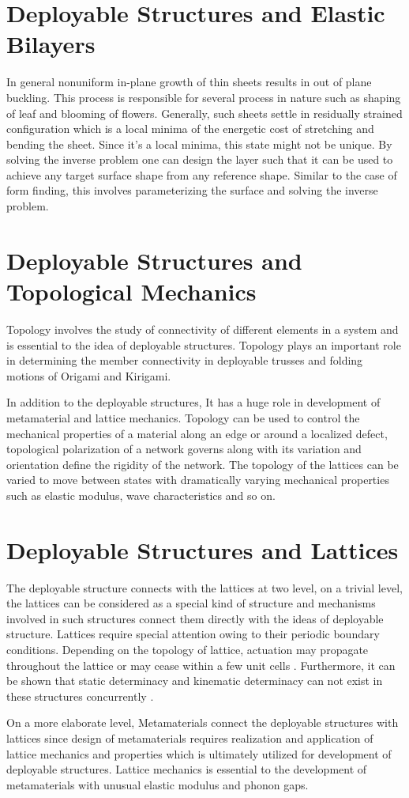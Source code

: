 \section{Deployable Structures and Elastic Bilayers}
In general nonuniform in-plane growth of thin sheets results in out of plane buckling. This process is responsible for several process in nature such as shaping of leaf and blooming of flowers. Generally, such sheets settle in residually strained configuration which is a local minima of the energetic cost of stretching and bending the sheet. Since it's a local minima, this state might not be unique. By solving the inverse problem one can design the layer such that it can be used to achieve any target surface shape from any reference shape\cite{va}. Similar to the case of form finding, this involves parameterizing the surface and solving the inverse problem.

\section{Deployable Structures and Topological Mechanics}
Topology involves the study of connectivity of different elements in a system and is essential to the idea of deployable structures. Topology plays an important role in determining the member connectivity in deployable trusses and folding motions of Origami and Kirigami\cite{Che}.

In addition to the deployable structures, It has a huge role in development of metamaterial\cite{Rock, Berto, Surj} and lattice mechanics\cite{Ma}. Topology can be used to control the mechanical properties of a material along an edge or around a localized defect, topological polarization of a network governs along with its variation and orientation define the rigidity of the network. The topology of the lattices can be varied to move between states with dramatically varying mechanical properties such as elastic modulus, wave characteristics and so on. 

\section{Deployable Structures and Lattices}
The deployable structure connects with the lattices at two level, on a trivial level, the lattices can be considered as a special kind of structure and mechanisms involved in such structures connect them directly with the ideas of deployable structure. Lattices require special attention owing to their periodic boundary conditions. Depending on the topology of lattice, actuation may propagate throughout the lattice or may cease within a few unit cells \cite{Neli}. Furthermore, it can be shown that static determinacy and kinematic determinacy can not exist in these structures concurrently \cite{Gues}. 

On a more elaborate level, Metamaterials connect the deployable structures with lattices since design of metamaterials requires realization and application of lattice mechanics and properties which is ultimately utilized for development of deployable structures. Lattice mechanics is essential to the development of metamaterials with unusual elastic modulus and phonon gaps.\cite{Ma}